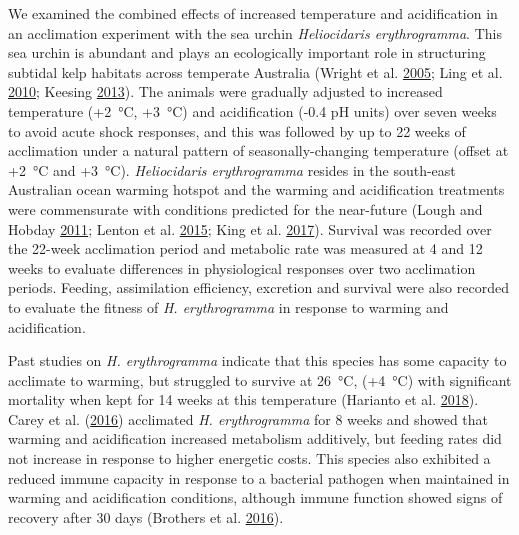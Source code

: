\documentclass[a4paper,10pt, oneside]{memoir}
\begin{document}
We examined the combined effects of increased temperature and acidification in an acclimation experiment with the sea urchin \textit{Heliocidaris erythrogramma}.
This sea urchin is abundant and plays an ecologically important role in structuring subtidal kelp habitats across temperate Australia (Wright et al. \protect\hyperlink{ref-Wright2005}{2005}; Ling et al. \protect\hyperlink{ref-Ling2010}{2010}; Keesing \protect\hyperlink{ref-Keesing2013}{2013}).
The animals were gradually adjusted to increased temperature (+\SI{2}{\celsius}, +\SI{3}{\celsius}) and acidification (-0.4 pH units) over seven weeks to avoid acute shock responses, and this was followed by up to 22 weeks of acclimation under a natural pattern of seasonally-changing temperature (offset at +\SI{2}{\celsius} and +\SI{3}{\celsius}).
\textit{Heliocidaris erythrogramma} resides in the south-east Australian ocean warming hotspot and the warming and acidification treatments were commensurate with conditions predicted for the near-future (Lough and Hobday \protect\hyperlink{ref-Lough2011}{2011}; Lenton et al. \protect\hyperlink{ref-Lenton2015}{2015}; King et al. \protect\hyperlink{ref-King2017}{2017}).
Survival was recorded over the 22-week acclimation period and metabolic rate was measured at 4 and 12 weeks to evaluate differences in physiological responses over two acclimation periods.
Feeding, assimilation efficiency, excretion and survival were also recorded to evaluate the fitness of \textit{H. erythrogramma} in response to warming and acidification.

Past studies on \textit{H. erythrogramma} indicate that this species has some capacity to acclimate to warming, but struggled to survive at \SI{26}{\celsius}, (+\SI{4}{\celsius}) with significant mortality when kept for 14 weeks at this temperature (Harianto et al. \protect\hyperlink{ref-Harianto2018}{2018}).
Carey et al. (\protect\hyperlink{ref-Carey2016}{2016}) acclimated \textit{H. erythrogramma} for 8 weeks and showed that warming and acidification increased metabolism additively, but feeding rates did not increase in response to higher energetic costs.
This species also exhibited a reduced immune capacity in response to a bacterial pathogen when maintained in warming and acidification conditions, although immune function showed signs of recovery after 30 days (Brothers et al. \protect\hyperlink{ref-Brothers2016}{2016}).
\end{document}
